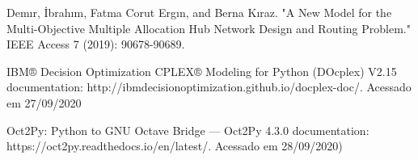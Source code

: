 \documentclass[conference]{IEEEtran}
\begin{document}
\begin{thebibliography}{1}

Demır, İbrahım, Fatma Corut Ergın, and Berna Kıraz. "A New Model for the Multi-Objective Multiple Allocation Hub Network Design and Routing Problem." IEEE Access 7 (2019): 90678-90689.

IBM® Decision Optimization CPLEX® Modeling for Python (DOcplex) V2.15 documentation: http://ibmdecisionoptimization.github.io/docplex-doc/. Acessado em  27/09/2020

Oct2Py: Python to GNU Octave Bridge — Oct2Py 4.3.0 documentation: https://oct2py.readthedocs.io/en/latest/. Acessado em 28/09/2020)


\end{thebibliography}


\end{document}
